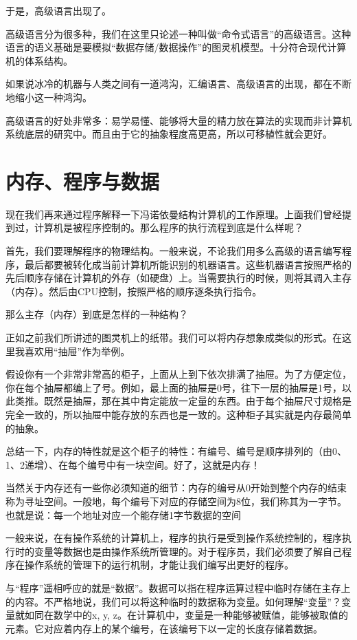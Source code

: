 于是，高级语言出现了。

高级语言分为很多种，我们在这里只论述一种叫做“命令式语言”的高级语言。这种语言的语义基础是要模拟“数据存储/数据操作”的图灵机模型。十分符合现代计算机的体系结构。

如果说冰冷的机器与人类之间有一道鸿沟，汇编语言、高级语言的出现，都在不断地缩小这一种鸿沟。

高级语言的好处非常多：易学易懂、能够将大量的精力放在算法的实现而非计算机系统底层的研究中。而且由于它的抽象程度高更高，所以可移植性就会更好。

\section{内存、程序与数据}

现在我们再来通过程序解释一下冯诺依曼结构计算机的工作原理。上面我们曾经提到过，计算机是被程序控制的。那么程序的执行流程到底是什么样呢？

首先，我们要理解程序的物理结构。一般来说，不论我们用多么高级的语言编写程序，最后都要被转化成当前计算机所能识别的机器语言。这些机器语言按照严格的先后顺序存储在计算机的外存（如硬盘）上。当需要执行的时候，则将其调入主存（内存）。然后由CPU控制，按照严格的顺序逐条执行指令。

那么主存（内存）到底是怎样的一种结构？

正如之前我们所讲述的图灵机上的纸带。我们可以将内存想象成类似的形式。在这里我喜欢用“抽屉”作为举例。

假设你有一个非常非常高的柜子，上面从上到下依次排满了抽屉。为了方便定位，你在每个抽屉都编上了号。例如，最上面的抽屉是0号，往下一层的抽屉是1号，以此类推。既然是抽屉，那在其中肯定能放一定量的东西。由于每个抽屉尺寸规格是完全一致的，所以抽屉中能存放的东西也是一致的。这种柜子其实就是内存最简单的抽象。

总结一下，内存的特性就是这个柜子的特性：有编号、编号是顺序排列的（由0、1、2递增）、在每个编号中有一块空间。好了，这就是内存！

当然关于内存还有一些你必须知道的细节：内存的编号从0开始到整个内存的结束称为寻址空间。一般地，每个编号下对应的存储空间为8位，我们称其为一字节。也就是说：每一个地址对应一个能存储1字节数据的空间

一般来说，在有操作系统的计算机上，程序的执行是受到操作系统控制的，程序执行时的变量等数据也是由操作系统所管理的。对于程序员，我们必须要了解自己程序在操作系统的管理下的运行机制，才能让我们编写出更好的程序。

与“程序”遥相呼应的就是“数据”。数据可以指在程序运算过程中临时存储在主存上的内容。不严格地说，我们可以将这种临时的数据称为变量。如何理解“变量”？变量就如同在数学中的x, y, z。在计算机中，变量是一种能够被赋值，能够被取值的元素。它对应着内存上的某个编号，在该编号下以一定的长度存储着数据。

